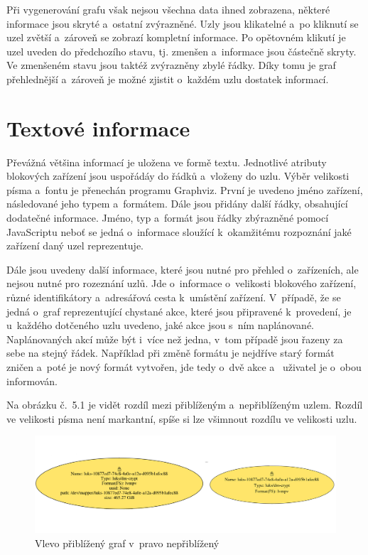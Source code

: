 \documentclass[color,table,oneside,nolot,nolof]{fithesis}
\begin{document}
	Při vygenerování grafu však nejsou všechna data ihned zobrazena, některé informace jsou skryté a~ostatní zvýrazněné. Uzly jsou klikatelné a~po kliknutí
	se uzel zvětší a~zároveň se zobrazí kompletní informace. Po opětovném klikutí je uzel uveden do předchozího stavu, tj. zmenšen a~informace jsou částečně 
	skryty. Ve zmenšeném stavu jsou taktéž zvýrazněny zbylé řádky. Díky tomu je graf přehlednější a~zároveň je možné zjistit o~každém uzlu dostatek informací.

\section{Textové informace}
  Převážná většina informací je uložena ve formě textu. Jednotlivé atributy blokových zařízení jsou uspořádáy do řádků a~vloženy do uzlu. Výběr velikosti
	písma a~fontu je přenechán programu Graphviz. První je uvedeno jméno zařízení, následované jeho typem a~formátem. Dále jsou přidány další řádky, 
	obsahující dodatečné informace. Jméno, typ a~formát jsou řádky zbýrazněné pomocí JavaScriptu neboť se jedná o~informace sloužící k~okamžitému rozpoznání
	jaké zařízení daný uzel reprezentuje.

	Dále jsou uvedeny další informace, které jsou nutné pro přehled o~zařízeních, ale nejsou nutné pro rozeznání uzlů. Jde o~informace o~velikosti blokového
	zařízení, různé identifikátory a~adresářová cesta k~umístění zařízení. V~případě, že se jedná o~graf reprezentující chystané akce, které jsou připravené
	k~provedení, je u~každého dotčeného uzlu uvedeno, jaké akce jsou s~ním naplánované. Naplánovaných akcí může být i~více než jedna, v~tom případě jsou
	řazeny za sebe na stejný řádek. Například při změně formátu je nejdříve starý formát zničen a~poté je nový formát vytvořen, jde tedy o~dvě akce a~
	uživatel je o~obou informován.

  Na obrázku č.~5.1 je vidět rozdíl mezi přiblíženým a~nepřiblíženým uzlem. Rozdíl ve velikosti písma není markantní, spíše si lze všimnout rozdílu ve velikosti 
	uzlu.

\begin{figure}[]
	\label{fig:Rozdíly uzlů}
	\caption{Vlevo přiblížený graf v~pravo nepřiblížený}
	\centering
	\includegraphics[width=1.0\columnwidth]{pictures/node_zoom.jpg}
\end{figure}
  
\end{document}
